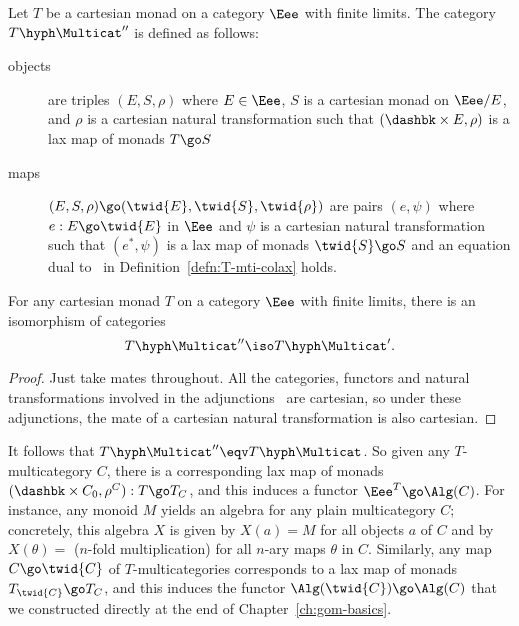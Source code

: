 \begin{defn}
Let $T$ be a cartesian monad on a category $\Eee$ with finite limits.  The
category $T\hyph\Multicat''$ is defined as follows:
%
\begin{description}
\item[objects] are triples $(E, S, \rho)$ where $E\in \Eee$, $S$ is a
cartesian monad on $\Eee/E$, and $\rho$ is a cartesian natural
transformation such that $(\dashbk\times E, \rho)$ is a lax map of monads
$T \go S$
\item[maps] $(E, S, \rho) \go (\twid{E}, \twid{S}, \twid{\rho})$ are pairs
$(e, \psi)$ where $e: E \go \twid{E}$ in $\Eee$ and $\psi$ is a cartesian
natural transformation such that $(e^*, \psi)$ is a lax map of monads
$\twid{S} \go S$ and an equation dual to~ in
Definition~\ref{defn:T-mti-colax} holds.
\end{description}
\end{defn}

\begin{propn}	%
For any cartesian monad $T$ on a category $\Eee$ with finite limits, there
is an isomorphism of categories
\[
T\hyph\Multicat'' \iso T\hyph\Multicat'.
\]
\end{propn}

\begin{proof}
Just take mates%
%
%
throughout.  All the categories, functors and natural
transformations involved in the adjunctions~ are
cartesian, so under these adjunctions, the mate of a cartesian natural
transformation is also cartesian.  \done
\end{proof}

It follows that $T\hyph\Multicat'' \eqv T\hyph\Multicat$.  So given any
$T$-multicategory $C$, there is a corresponding lax map of monads
$(\dashbk\times C_0, \rho^C): T \go T_C$, and this induces a functor
$\Eee^T \go \Alg(C)$.  For instance, any monoid $M$ yields an algebra
for any plain multicategory $C$; concretely, this algebra $X$ is given
by $X(a)=M$ for all objects $a$ of $C$ and by $X(\theta) = $ ($n$-fold
multiplication) for all $n$-ary maps $\theta$ in $C$.  Similarly, any map
$C \go \twid{C}$ of $T$-multicategories corresponds to a lax map of monads
$T_{\twid{C}} \go T_C$, and this induces the functor $\Alg(\twid{C}) \go
\Alg(C)$ that we constructed directly at the end of
Chapter~\ref{ch:gom-basics}.%
%
%



